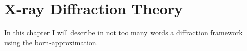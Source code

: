 \chapter{X-ray Diffraction Theory}\label{diffraction_theory}\noindent

In this chapter I will describe in not too many words a diffraction framework
using the born-approximation.